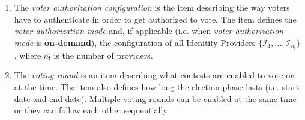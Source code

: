 \begin{enumerate}
    \item The \textit{voter authorization configuration} is the item describing the way voters have to authenticate in order to get authorized to vote. The item defines the \textit{voter authorization mode} and, if applicable (i.e. when \textit{voter authorization mode} is \textbf{on-demand}), the configuration of all Idenitity Providers $\{\mathcal{I}_1, ..., \mathcal{I}_{n_\mathrm{i}}\}$, where $n_\mathrm{i}$ is the number of providers.
    
    \item The \textit{voting round} is an item describing what contests are enabled to vote on at the time. The item also defines how long the election phase lasts (i.e. start date and end date). Multiple voting rounds can be enabled at the same time or they can follow each other sequentially.
\end{enumerate}

